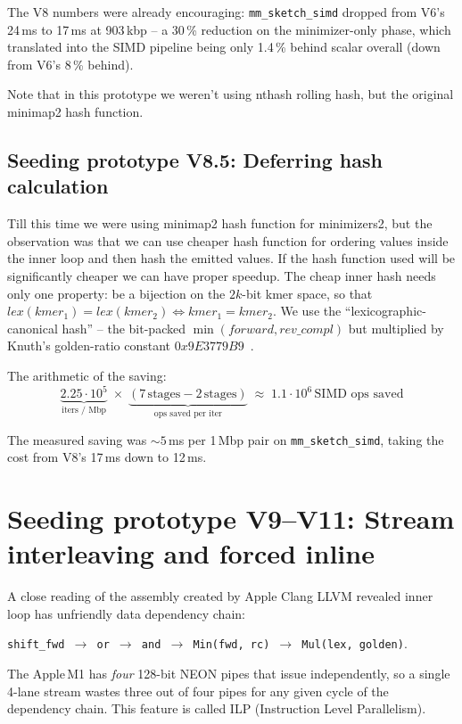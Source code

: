 The V8 numbers were already encouraging:
\texttt{mm\_sketch\_simd} dropped from V6's 24\,ms to 17\,ms at
903\,kbp -- a 30\,\% reduction on the minimizer-only phase, which
translated into the SIMD pipeline being only 1.4\,\% behind scalar
overall (down from V6's 8\,\% behind).

Note that in this prototype we weren't using nthash rolling hash, but the original minimap2 hash function.

\subsection{Seeding prototype V8.5: Deferring hash calculation}
\label{sec:v8-defer-scramble}

Till this time we were using minimap2 hash function for minimizers2, but the observation was that we can use cheaper hash function for ordering values inside the inner loop and then hash the emitted values. If the hash function used will be significantly cheaper we can have proper speedup.
The cheap inner hash needs only one
property: be a bijection on the $2k$-bit kmer space, so that
$\textit{lex}(\textit{kmer}_1) = \textit{lex}(\textit{kmer}_2) \iff
\textit{kmer}_1 = \textit{kmer}_2$.  We use the
``lexicographic-canonical hash'' -- the bit-packed
$\min(\textit{forward}, \textit{rev\_compl})$ but multiplied
by Knuth's golden-ratio constant
$0x9E3779B9$~\cite{knuth_taocp_v3}.

The arithmetic of the saving:
\[
\underbrace{2.25 \cdot 10^5}_{\text{iters / Mbp}}
\;\times\;
\underbrace{(7\,\text{stages} - 2\,\text{stages})}_{\text{ops saved per iter}}
\;\approx\;
1.1 \cdot 10^6\,\text{SIMD ops saved}
\]

The measured saving was $\sim 5$\,ms per 1\,Mbp pair on
\texttt{mm\_sketch\_simd}, taking the cost from V8's 17\,ms down to
12\,ms.

\section{Seeding prototype V9--V11: Stream interleaving and forced inline}
\label{sec:v11-v12}

A close reading of the assembly created by Apple Clang LLVM revealed inner loop has unfriendly data dependency chain:
\begin{center}
  \texttt{shift\_fwd $\to$ or $\to$ and $\to$ Min(fwd, rc) $\to$ Mul(lex, golden)}.
\end{center}

The Apple\,M1 has \emph{four} 128-bit NEON
pipes that issue independently, so a single 4-lane stream wastes
three out of four pipes for any given cycle of the dependency
chain. This feature is called ILP (Instruction Level Parallelism).

